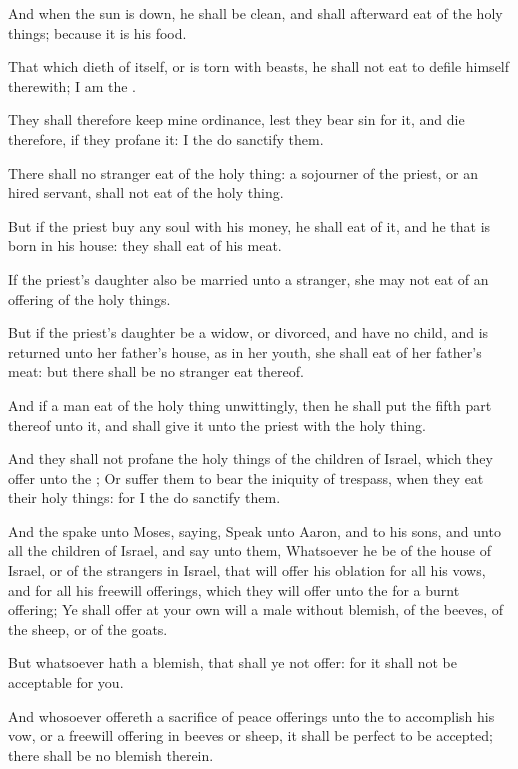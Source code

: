 \Verse And when the sun is down, he shall be clean, and shall afterward eat of the holy things; because it is his food.

\Verse That which dieth of itself, or is torn with beasts, he shall not eat to defile himself therewith; I am the \LORD.

\Verse They shall therefore keep mine ordinance, lest they bear sin for it, and die therefore, if they profane it: I the \LORD do sanctify them.

\Verse There shall no stranger eat of the holy thing: a sojourner of the priest, or an hired servant, shall not eat of the holy thing.

\Verse But if the priest buy any soul with his money, he shall eat of it, and he that is born in his house: they shall eat of his meat.

\Verse If the priest's daughter also be married unto a stranger, she may not eat of an offering of the holy things.

\Verse But if the priest's daughter be a widow, or divorced, and have no child, and is returned unto her father's house, as in her youth, she shall eat of her father's meat: but there shall be no stranger eat thereof.

\Verse And if a man eat of the holy thing unwittingly, then he shall put the fifth part thereof unto it, and shall give it unto the priest with the holy thing.

\Verse And they shall not profane the holy things of the children of Israel, which they offer unto the \LORD; \Verse Or suffer them to bear the iniquity of trespass, when they eat their holy things: for I the \LORD do sanctify them.

\Verse And the \LORD spake unto Moses, saying, \Verse Speak unto Aaron, and to his sons, and unto all the children of Israel, and say unto them, Whatsoever he be of the house of Israel, or of the strangers in Israel, that will offer his oblation for all his vows, and for all his freewill offerings, which they will offer unto the \LORD for a burnt offering; \Verse Ye shall offer at your own will a male without blemish, of the beeves, of the sheep, or of the goats.

\Verse But whatsoever hath a blemish, that shall ye not offer: for it shall not be acceptable for you.

\Verse And whosoever offereth a sacrifice of peace offerings unto the \LORD to accomplish his vow, or a freewill offering in beeves or sheep, it shall be perfect to be accepted; there shall be no blemish therein.

